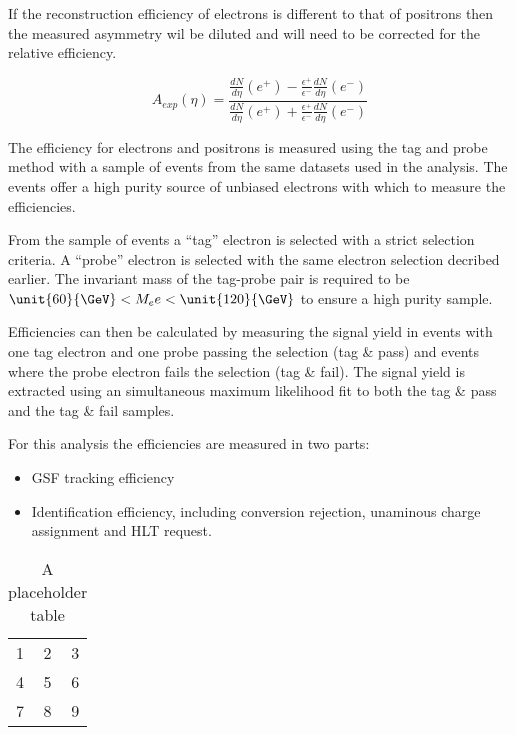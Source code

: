 If the reconstruction efficiency of electrons is different to that of positrons
then the measured asymmetry wil be diluted and will need to be corrected for
the relative efficiency.

\begin{equation}
A_{exp}(\eta) = \frac{
                    \frac{dN}{d\eta}(e^+)-
                    \frac{\epsilon^+}{\epsilon^-}\frac{dN}{d\eta}(e^-)
                }
                {
                    \frac{dN}{d\eta}(e^+)+
                    \frac{\epsilon^+}{\epsilon^-}\frac{dN}{d\eta}(e^-)
                }
\end{equation}

The efficiency for electrons and positrons is measured using the tag and probe
method %
with a sample of \Zee events from the same datasets used in the analysis. 
The \Zee events offer a high purity source of unbiased electrons with which to
measure the efficiencies.

From the sample of \Zee events a ``tag'' electron is selected with a strict
selection criteria. 
A ``probe'' electron is selected with the same electron selection decribed
earlier.
The invariant mass of the tag-probe pair is required to be
$\unit{60}{\GeV} < M_ee < \unit{120}{\GeV}$ to ensure a high purity sample.

Efficiencies can then be calculated by measuring the signal yield in events
with one tag electron and one probe passing the selection (tag \& pass) and
events where the probe electron fails the selection (tag \& fail).
The signal yield is extracted using an simultaneous maximum likelihood fit to
both the tag \& pass and the tag \& fail samples.

For this analysis the efficiencies are measured in two parts:

\begin{itemize}
    \item GSF tracking efficiency
    \item Identification efficiency, including conversion rejection, unaminous
charge assignment and HLT request.
\end{itemize}

\begin{table}[htb]
  \centering
  \begin{tabular}{| l c r |}
    \hline
    1 & 2 & 3 \\
    4 & 5 & 6 \\
    7 & 8 & 9 \\
  \hline
  \end{tabular}
  \caption{A placeholder table}
  \label{asym36:tagprobe}
\end{table}


